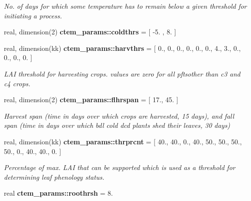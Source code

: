 \begin{DoxyCompactItemize}
\begin{DoxyCompactList}\small\item\em No. of days for which some temperature has to remain below a given threshold for initiating a process. \end{DoxyCompactList}\item 
real, dimension(2) {\bfseries ctem\+\_\+params\+::coldthrs} = \mbox{[} -\/5. , 8. \mbox{]}
\item 
\hypertarget{namespacectem__params_a3692335bc09fe9876e4054a0658982ff}{}real, dimension(kk) {\bfseries ctem\+\_\+params\+::harvthrs} = \mbox{[} 0., 0., 0., 0., 0., 0., 4., 3., 0., 0., 0., 0. \mbox{]}\label{namespacectem__params_a3692335bc09fe9876e4054a0658982ff}

\begin{DoxyCompactList}\small\item\em L\+A\+I threshold for harvesting crops. values are zero for all pftsother than c3 and c4 crops. \end{DoxyCompactList}\item 
\hypertarget{namespacectem__params_a766b351a6a0cf14bfa75068e43a300da}{}real, dimension(2) {\bfseries ctem\+\_\+params\+::flhrspan} = \mbox{[} 17., 45. \mbox{]}\label{namespacectem__params_a766b351a6a0cf14bfa75068e43a300da}

\begin{DoxyCompactList}\small\item\em Harvest span (time in days over which crops are harvested, 15 days), and fall span (time in days over which bdl cold dcd plants shed their leaves, 30 days) \end{DoxyCompactList}\item 
\hypertarget{namespacectem__params_af5b1d396f621af177ae9b6011942df1c}{}real, dimension(kk) {\bfseries ctem\+\_\+params\+::thrprcnt} = \mbox{[} 40., 40., 0., 40., 50., 50., 50., 50., 0., 40., 40., 0. \mbox{]}\label{namespacectem__params_af5b1d396f621af177ae9b6011942df1c}

\begin{DoxyCompactList}\small\item\em Percentage of max. L\+A\+I that can be supported which is used as a threshold for determining leaf phenology status. \end{DoxyCompactList}\item 
\hypertarget{namespacectem__params_a282fb31f18fec9021b409ebbb0a3882c}{}real {\bfseries ctem\+\_\+params\+::roothrsh} = 8.\label{namespacectem__params_a282fb31f18fec9021b409ebbb0a3882c}


\end{DoxyCompactItemize}

